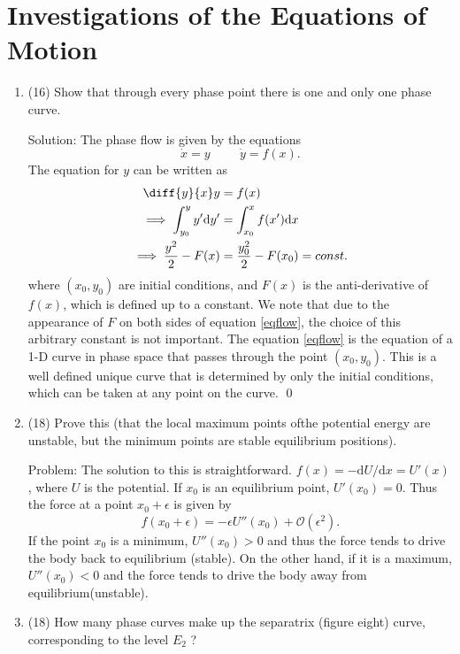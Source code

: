 \chapter{Investigations of the Equations of Motion}\label{chap2}

\begin{enumerate}
	\item (16) Show that through every phase point there is one and only one	phase curve.\par 
	Solution: The phase flow is given by the equations
	\begin{equation}\label{flow}
		\dot{x} = y\hspace{1cm} \dot{y} = f(x).
	\end{equation}
	The equation for $y$ can be written as
	\begin{align}
		\diff{y}{x} y &= f(x)\\
		\implies \int_{y_0}^{y} y'\mathrm{d}y' & = \int_{x_0}^x f(x')\mathrm{d}x\\
		\implies \frac{y^2}{2} - F(x) &= \frac{y_0^2}{2} - F(x_0) = const.\label{eqflow}
	\end{align}
where $(x_0,y_0)$ are initial conditions, and $F(x)$ is the anti-derivative of $f(x)$, which is defined up to a constant. We note that due to the appearance of $F$ on both sides of equation \eqref{eqflow}, the choice of this arbitrary constant is not important. The equation \eqref{eqflow} is the equation of a 1-D curve in phase space that passes through the point $(x_0,y_0)$. This is a well defined unique curve that is determined by only the initial conditions, which can be taken at any point on the curve. \qed
\item (18) Prove this (that the local maximum points ofthe
potential energy are unstable, but the minimum points are stable equilibrium
positions).\par
Problem: The solution to this is straightforward. $f(x) = -\mathrm{d}U/\mathrm{d}x = U'(x)$, where $U$ is the potential. If $x_0$ is an equilibrium point, $U'(x_0) = 0$. Thus the force at a point $x_0+\epsilon$ is given by\begin{equation}\label{key}
	f(x_0+\epsilon) = -\epsilon U''(x_0) + \mathcal{O}(\epsilon^2).
\end{equation}
If the point $x_0$ is a minimum, $U''(x_0)>0$ and thus the force tends to drive the body back to equilibrium (stable). On the other hand, if it is a maximum, $U''(x_0)<0$ and the force tends to drive the body away from equilibrium(unstable).
\item (18) How many phase curves make up the separatrix (figure eight) curve, corresponding to the level $E_2$ ?\par

\end{enumerate}
